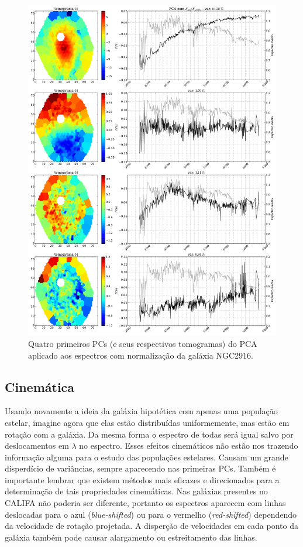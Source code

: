 \begin{figure}
    \includegraphics[width=1.\textwidth]{figuras/K0277-tomo1a4-norm.pdf}
    \caption[Tomogramas de 1 a 4 da gal\'axia NGC2916 - com normaliza\c{c}\~ao.]
    {Quatro primeiros PCs (e seus respectivos tomogramas) do PCA aplicado aos espectros com normalização da galáxia
    NGC2916.}
    \label{fig:UsoPCA:K277tomofobsnorm}
\end{figure}

\subsection{Cinemática}
\label{sec:UsoPCA:PCAlidades:cinem}

Usando novamente a ideia da galáxia hipotética com apenas uma população estelar, imagine agora que elas estão
distribuídas uniformemente, mas estão em rotação com a galáxia. Da mesma forma o espectro de todas será igual salvo por
deslocamentos em $\lambda$ no espectro. Esses efeitos cinemáticos não estão nos trazendo informação alguma para o estudo
das populações estelares. Causam um grande disperdício de variâncias, sempre aparecendo nas primeiras PCs. Também é
importante lembrar que existem métodos mais eficazes e direcionados para a determinação de tais propriedades
cinemáticas. Nas galáxias presentes no CALIFA não poderia ser diferente, portanto os espectros aparecem com linhas
deslocadas para o azul ({\em blue-shifted}) ou para o vermelho ({\em red-shifted}) dependendo da velocidade de rotação
projetada. A disperção de velocidades em cada ponto da galáxia também pode causar alargamento ou estreitamento das
linhas.

